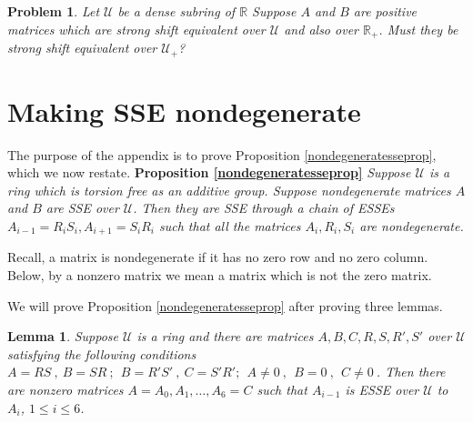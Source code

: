 \documentclass{amsart}
\newtheorem{lemma}[theorem]{Lemma}
\newtheorem{problem}[theorem]{Problem}
\theoremstyle{definition}
\theoremstyle{remark}
\newcommand{\ri}{\mathcal U}
\numberwithin{equation}{section}
\begin{document}
{{\begin{problem}\label{sserefinementproblem}
Let $\mathcal U$ be a dense subring of 
$\mathbb R$ Suppose  $A$ and $B$ are positive matrices which are strong shift 
equivalent over $\mathcal U$ and also over $\mathbb R_+$. 
Must they be strong shift equivalent over $\mathcal U_+$? 
\end{problem}



 


\appendix 
\section{Making SSE nondegenerate} \label{nondegenerateappendix} 

The purpose of the appendix is to prove
Proposition \ref{nondegeneratesseprop}, which we now restate. 
\newline \newline 
{\bf Proposition \ref{nondegeneratesseprop}} 
{\it 
Suppose $\ri$ is a ring which is torsion free as an additive group. 
Suppose nondegenerate matrices $A$ and $B$ are SSE over $\ri$. 
Then they are SSE through a chain of ESSEs 
$A_{i-1} =R_iS_i, A_{i+1}=S_iR_i$ such that all the matrices 
$A_i, R_i,S_i $ are nondegenerate. } 
 
Recall, a matrix is nondegenerate if it has no zero row and no zero 
column. Below, by a nonzero matrix we mean a matrix which is not 
the zero matrix. 


We will prove  Proposition 
 \ref{nondegeneratesseprop} after proving three lemmas. 

\begin{lemma} \label{onezerotonozero}
Suppose $\ri$ is a ring and there are matrices 
$A,B,C,R,S,R',S'$ 
over $\ri$ 
satisfying the following conditions
$A = RS\ , \   B=SR\ ;\ \ 
B = R'S'\ , \   C=S'R'   ;\ \ 
A \neq 0\ ,  \ \  B = 0 \ ,  \ \  C \neq 0 \  
$.  
Then there are nonzero matrices $A=A_0, A_1, \dots , A_6=C$  such 
that $A_{i-1} $ is ESSE over $\ri$ to $A_i$, $1\leq i \leq 6$. 
\end{lemma} 

}}
\end{document}
